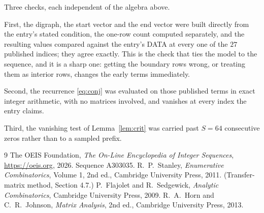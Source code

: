 \documentclass[11pt,a4paper]{article}
\theoremstyle{plain}
\theoremstyle{definition}
\begin{document}
Three checks, each independent of the algebra above.

First, the digraph, the start vector and the end vector were built directly from the
entry's stated condition, the one-row count computed separately, and the resulting values
compared against the entry's DATA at every one of the $27$ published indices; they
agree exactly. This is the check that ties the model to the sequence, and it is a sharp one:
getting the boundary rows wrong, or treating them as interior rows, changes the early terms
immediately.

Second, the recurrence \eqref{eq:conj} was evaluated on those published terms in exact
integer arithmetic, with no matrices involved, and vanishes at every index the entry claims.

Third, the vanishing test of Lemma~\ref{lem:crit} was carried past $S=64$ consecutive
zeros rather than to a sampled prefix.

\begin{thebibliography}{9}
 The OEIS Foundation, \emph{The On-Line Encyclopedia of Integer
Sequences}, \url{https://oeis.org}, 2026. Sequence A303035.
 R.~P.~Stanley, \emph{Enumerative Combinatorics}, Volume 1, 2nd ed.,
Cambridge University Press, 2011. (Transfer-matrix method, Section 4.7.)
 P.~Flajolet and R.~Sedgewick, \emph{Analytic Combinatorics}, Cambridge
University Press, 2009.
 R.~A.~Horn and C.~R.~Johnson, \emph{Matrix Analysis}, 2nd ed., Cambridge
University Press, 2013.
\end{thebibliography}
\end{document}
